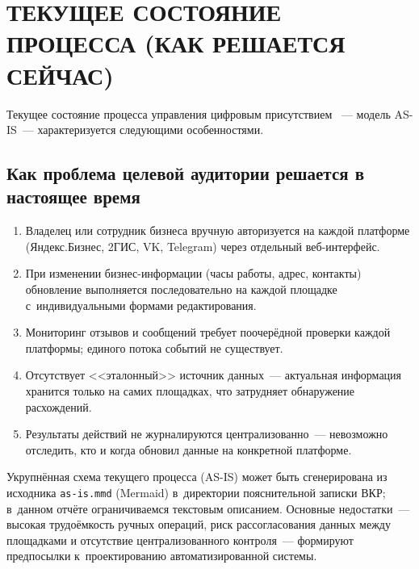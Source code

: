 \chapter{{\fontsize{14pt}{21pt}\selectfont\MakeUppercase{Текущее состояние процесса (как решается сейчас)}}}
\label{ch:current-state}

Текущее состояние процесса управления цифровым присутствием ~--- модель AS-IS~--- характеризуется следующими особенностями.

\section{Как проблема целевой аудитории решается в настоящее время}

\begin{enumerate}
  \item Владелец или сотрудник бизнеса вручную авторизуется на каждой платформе (Яндекс.Бизнес, 2ГИС, VK, Telegram) через отдельный веб-интерфейс.
  \item При изменении бизнес-информации (часы работы, адрес, контакты) обновление выполняется последовательно на каждой площадке с~индивидуальными формами редактирования.
  \item Мониторинг отзывов и сообщений требует поочерёдной проверки каждой платформы; единого потока событий не существует.
  \item Отсутствует <<эталонный>> источник данных~--- актуальная информация хранится только на самих площадках, что затрудняет обнаружение расхождений.
  \item Результаты действий не журналируются централизованно~--- невозможно отследить, кто и когда обновил данные на конкретной платформе.
\end{enumerate}

Укрупнённая схема текущего процесса (AS-IS) может быть сгенерирована из исходника \texttt{as-is.mmd} (Mermaid) в~директории пояснительной записки ВКР; в~данном отчёте ограничиваемся текстовым описанием. Основные недостатки~--- высокая трудоёмкость ручных операций, риск рассогласования данных между площадками и отсутствие централизованного контроля~--- формируют предпосылки к~проектированию автоматизированной системы.
